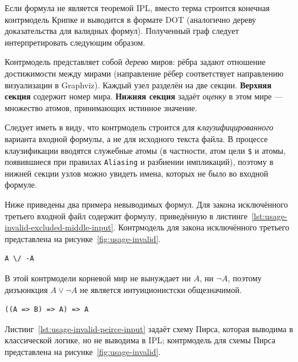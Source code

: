 \documentclass[14pt, russian]{scrartcl}
\begin{document}
Если формула не является теоремой IPL, вместо терма строится конечная
контрмодель Крипке и выводится в формате DOT (аналогично дереву доказательства
для валидных формул). Полученный граф следует интерпретировать следующим
образом.

Контрмодель представляет собой \emph{дерево} миров: рёбра задают отношение
достижимости между мирами (направление рёбер соответствует направлению
визуализации в Graphviz). Каждый узел разделён на две секции. \textbf{Верхняя
секция} содержит номер мира. \textbf{Нижняя секция} задаёт \emph{оценку} в
этом мире --- множество атомов, принимающих истинное значение.

Следует иметь в виду, что контрмодель строится для \emph{клаузифицированного}
варианта входной формулы, а не для исходного текста файла. В процессе
клаузификации вводятся служебные атомы (в частности, атом цели \texttt{\$} и
атомы, появившиеся при правилах \texttt{Aliasing} и разбиении импликаций),
поэтому в нижней секции узлов можно увидеть имена, которых не было во входной
формуле.

Ниже приведены два примера невыводимых формул. Для закона исключённого третьего
входной файл содержит формулу, приведённую в
листинге~\ref{lst:usage-invalid-excluded-middle-input}. Контрмодель для закона
исключённого третьего представлена на
рисунке~\ref{fig:usage-invalid}.


\begin{listing}[!htb]
\caption{Входная формула \texttt{invalid-excluded-middle.txt}}
\label{lst:usage-invalid-excluded-middle-input}
\begin{verbatim}
A \/ -A
\end{verbatim}
\end{listing}

В этой контрмодели корневой мир не вынуждает ни $A$, ни $\neg A$, поэтому дизъюнкция $A \lor \neg A$ не является интуиционистски общезначимой.

\begin{listing}[!htb]
\caption{Входная формула \texttt{invalid-peirce.txt}}
\label{lst:usage-invalid-peirce-input}
\begin{verbatim}
((A => B) => A) => A
\end{verbatim}
\end{listing}

Листинг~\ref{lst:usage-invalid-peirce-input} задаёт схему Пирса, которая
выводима в классической логике, но не выводима в IPL; контрмодель для схемы Пирса представлена на рисунке~\ref{fig:usage-invalid}.
\end{document}
